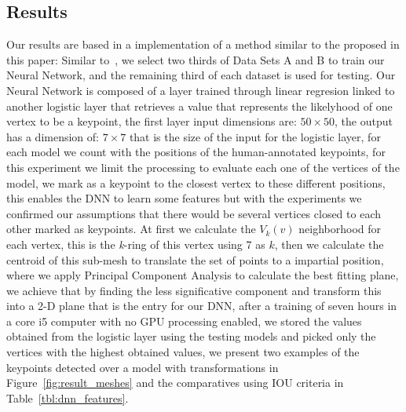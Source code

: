 \documentclass{comjnl}
\begin{document}
\subsection{Results}
Our results are based in a implementation of a method similar to the proposed
in this paper: Similar to~\cite{Lin2016}, we select two thirds of Data Sets A
and B to train our Neural Network, and the remaining third of each dataset is
used for testing. Our Neural Network is composed of a layer trained through 
linear regresion linked to another logistic layer that retrieves a value that
represents the likelyhood of one vertex to be a keypoint, the first layer input
dimensions are: $50 \times 50 $, the output
has a dimension of: $7 \times 7$ that is the size of the input for the logistic layer,
for each model we count with the positions of the human-annotated keypoints, for
this experiment we limit the processing to evaluate each one of the vertices of
the model, we mark as a keypoint to the closest vertex to these different positions,
this enables the DNN to learn some features but with the experiments we confirmed 
our assumptions that there would be several vertices closed to each other marked as
keypoints. At first we calculate the $V_{k}(v)$ neighborhood for each vertex,
this is the \textit{k}-ring of this vertex using 7 as $k$, then we calculate the
centroid of this sub-mesh to translate the set of points to a impartial position,
where we apply Principal Component Analysis to calculate the best fitting plane,
we achieve that by finding the less significative component and transform this into
a 2-D plane that is the entry for our DNN, after a training of seven hours in a
core i5 computer with no GPU processing enabled, we stored the values obtained
from the logistic layer using the testing models and picked only the vertices with
the highest obtained values, we present two examples of the keypoints detected over
a model with transformations in Figure~\ref{fig:result_meshes} and the
comparatives using IOU criteria in Table~\ref{tbl:dnn_features}.
\end{document}
